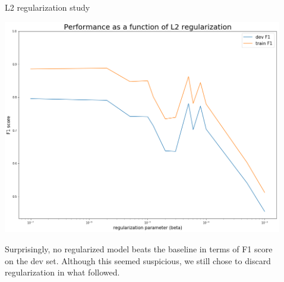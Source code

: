 \documentclass[final]{beamer}
\newlength{\sepwid}
\newlength{\onecolwid}
\newlength{\twocolwid}
\begin{document}
\begin{frame}[t]
\begin{columns}[t]
\begin{column}{\twocolwid}
\begin{columns}[t,totalwidth=\twocolwid]
\begin{column}{\onecolwid}

\begin{block}{L2 regularization study}

\begin{center}
\includegraphics[scale=0.5]{figs/l2_graph.png}
\end{center}

Surprisingly, no regularized model beats the baseline in terms of F1 score on the dev set. Although this seemed suspicious, we still chose to discard regularization in what followed.

\end{block}


\end{column} %

\end{columns} %

\end{column} %

\begin{column}{\sepwid}\end{column} %

\begin{column}{\onecolwid} %


\end{column}
\end{columns}
\end{frame}
\end{document}
